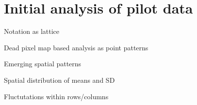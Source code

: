 \documentclass[../../IO-Pixels.tex]{subfiles}
\begin{document}
\section{Initial analysis of pilot data}
\begin{outline}
Notation as lattice

Dead pixel map based analysis as point patterns

Emerging spatial patterns

Spatial distribution of means and SD

Fluctutations within rows/columns
\end{outline}
\end{document}
